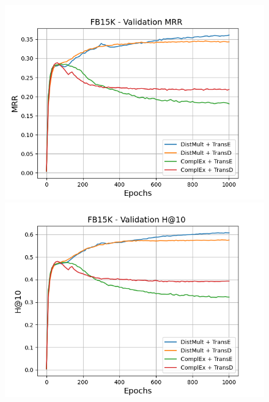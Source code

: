 \begin{figure}[H]
    \centering
    \begin{minipage}{.5\textwidth}
      \centering
      \includegraphics[width=\linewidth]{figures/results/gan_train/not_pretrained/uncertainty/max/entropy/fb15k/1k_epochs/uncertainty_fb15k_mrrs.png}
    \end{minipage}%
    \begin{minipage}{.5\textwidth}
      \centering
      \includegraphics[width=\linewidth]{figures/results/gan_train/not_pretrained/uncertainty/max/entropy/fb15k/1k_epochs/uncertainty_fb15k_hit10.png}
    \end{minipage}
    

\end{figure}
